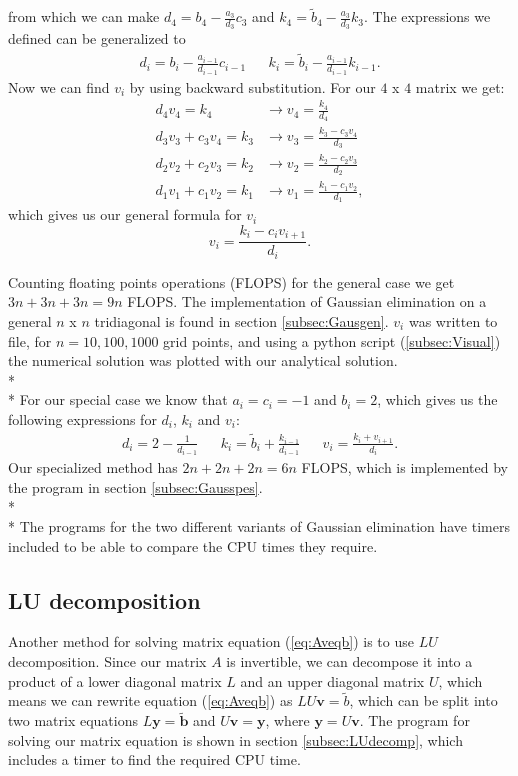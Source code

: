 \documentclass[norsk,a4paper,12pt]{article}
\begin{document}
from which we can make $d_4=b_4-\frac{a_3}{d_3}c_3$ and $k_4 = \tilde{b}_4-\frac{a_3}{d_3}k_3$. The expressions we defined can be generalized to \begin{align*}
d_i=b_i-\frac{a_{i-1}}{d_{i-1}}c_{i-1} && k_i=\tilde{b}_i-\frac{a_{i-1}}{d_{i-1}}k_{i-1}.
\end{align*}
Now we can find $v_i$ by using backward substitution. For our $4$ x $4$ matrix we get:
\begin{align*}
d_4v_4=k_4 &\rightarrow v_4 = \frac{k_4}{d_4} \\
d_3v_3+c_3v_4 = k_3 &\rightarrow v_3=\frac{k_3-c_3v_4}{d_3} \\
d_2v_2+c_2v_3 = k_2 &\rightarrow v_2=\frac{k_2-c_2v_3}{d_2} \\
d_1v_1+c_1v_2 = k_1 &\rightarrow v_1=\frac{k_1-c_1v_2}{d_1},
\end{align*}
which gives us our general formula for $v_i$
$$v_i=\frac{k_i-c_iv_{i+1}}{d_i}.$$

Counting floating points operations (FLOPS) for the general case we get $3n+3n+3n=9n$ FLOPS. The implementation of Gaussian elimination on a general $n$ x $n$ tridiagonal is found in section \ref{subsec:Gausgen}. $v_i$ was written to file, for $n=10,100,1000$ grid points, and using a python script (\ref{subsec:Visual}) the numerical solution was plotted with our analytical solution. 
\\* \\* \noindent
For our special case we know that $a_i=c_i=-1$ and $b_i=2$, which gives us the following expressions for $d_i$, $k_i$ and $v_i$:
\begin{align*}
d_i = 2-\frac{1}{d_{i-1}} && k_i = \tilde{b}_i + \frac{k_{i-1}}{d_{i-1}} && v_i = \frac{k_i+v_{i+1}}{d_i}.
\end{align*}
Our specialized method has $2n+2n+2n=6n$ FLOPS, which is implemented by the program in section \ref{subsec:Gausspes}.
\\* \\* \noindent
The programs for the two different variants of Gaussian elimination have timers included to be able to compare the CPU times they require.


\subsection{LU decomposition}
Another method for solving matrix equation (\ref{eq:Aveqb}) is to use $LU$ decomposition. Since our matrix $A$ is invertible, we can decompose it into a product of a lower diagonal matrix $L$ and an upper diagonal matrix $U$, which means we can rewrite equation (\ref{eq:Aveqb}) as $LU\textbf{v} = \tilde{b}$, which can be split into two matrix equations $L\textbf{y} = \tilde{\textbf{b}}$ and $U\textbf{v} = \textbf{y}$, where $\textbf{y} = U\textbf{v}$. The program for solving our matrix equation is shown in section \ref{subsec:LUdecomp}, which includes a timer to find the required CPU time.
\end{document}
